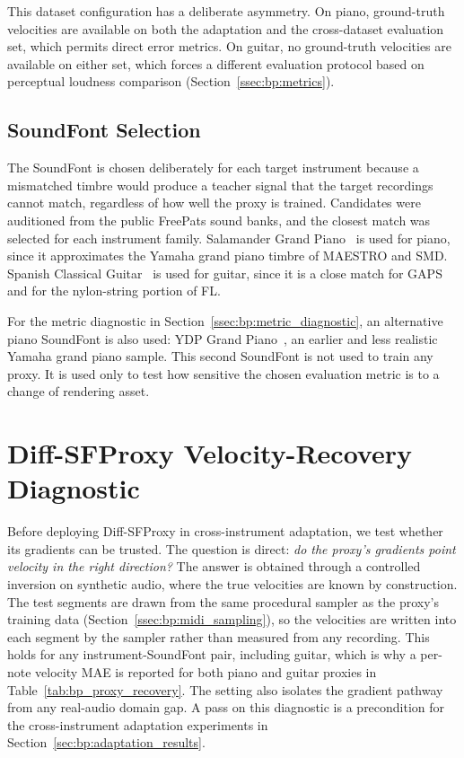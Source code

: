 This dataset configuration has a deliberate asymmetry. On piano, ground-truth velocities are available on both the adaptation and the cross-dataset evaluation set, which permits direct error metrics. On guitar, no ground-truth velocities are available on either set, which forces a different evaluation protocol based on perceptual loudness comparison (Section~\ref{ssec:bp:metrics}).

\subsection{SoundFont Selection}
\label{ssec:bp:soundfonts}

The SoundFont is chosen deliberately for each target instrument because a mismatched timbre would produce a teacher signal that the target recordings cannot match, regardless of how well the proxy is trained. Candidates were auditioned from the public FreePats sound banks, and the closest match was selected for each instrument family. Salamander Grand Piano~\cite{sf_salamander} is used for piano, since it approximates the Yamaha grand piano timbre of MAESTRO and SMD. Spanish Classical Guitar~\cite{sf_spanishguitar} is used for guitar, since it is a close match for GAPS and for the nylon-string portion of FL.

For the metric diagnostic in Section~\ref{ssec:bp:metric_diagnostic}, an alternative piano SoundFont is also used: YDP Grand Piano~\cite{sf_ydpgrand}, an earlier and less realistic Yamaha grand piano sample. This second SoundFont is not used to train any proxy. It is used only to test how sensitive the chosen evaluation metric is to a change of rendering asset.

\section{Diff-SFProxy Velocity-Recovery Diagnostic}
\label{sec:bp:proxy_diagnostic}

Before deploying Diff-SFProxy in cross-instrument adaptation, we test whether its gradients can be trusted. The question is direct: \emph{do the proxy's gradients point velocity in the right direction?} The answer is obtained through a controlled inversion on synthetic audio, where the true velocities are known by construction. The test segments are drawn from the same procedural sampler as the proxy's training data (Section~\ref{ssec:bp:midi_sampling}), so the velocities are written into each segment by the sampler rather than measured from any recording. This holds for any instrument-SoundFont pair, including guitar, which is why a per-note velocity MAE is reported for both piano and guitar proxies in Table~\ref{tab:bp_proxy_recovery}. The setting also isolates the gradient pathway from any real-audio domain gap. A pass on this diagnostic is a precondition for the cross-instrument adaptation experiments in Section~\ref{sec:bp:adaptation_results}.

